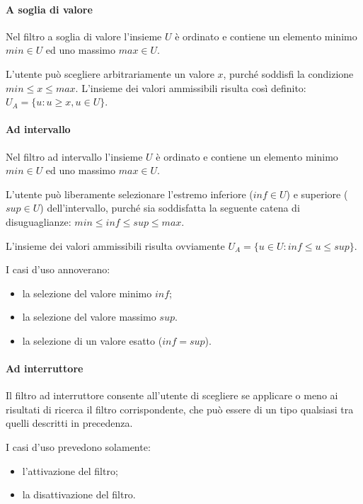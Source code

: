 \paragraph{A soglia di valore}
Nel filtro a soglia di valore l'insieme $U$ è ordinato e contiene un elemento minimo $min \in U$ ed uno massimo $max \in U$.

L'utente può scegliere arbitrariamente un valore $x$, purché soddisfi la condizione $min \leq x \leq max$. L'insieme dei valori ammissibili risulta così definito: $U_A = \lbrace u : u \geq x, u \in U\rbrace$.

\paragraph{Ad intervallo}
Nel filtro ad intervallo l'insieme $U$ è ordinato e contiene un elemento minimo $min \in U$ ed uno massimo $max \in U$.

L'utente può liberamente selezionare l'estremo inferiore ($inf \in U$) e superiore ($sup\in U$) dell'intervallo, purché sia soddisfatta la seguente catena di disuguaglianze: $min \leq inf \leq sup \leq max$.

L'insieme dei valori ammissibili risulta ovviamente $U_A = \lbrace u \in U : inf \leq u \leq sup \rbrace$.

I casi d'uso annoverano:
\begin{itemize}
	\item la selezione del valore minimo $inf$;
	\item la selezione del valore massimo $sup$.
	\item la selezione di un valore esatto ($inf = sup$).
\end{itemize}

\paragraph{Ad interruttore}
Il filtro ad interruttore consente all'utente di scegliere se applicare o meno ai risultati di ricerca il filtro corrispondente, che può essere di un tipo qualsiasi tra quelli descritti in precedenza.

I casi d'uso prevedono solamente:
\begin{itemize}
	\item l'attivazione del filtro;
	\item la disattivazione del filtro.
\end{itemize}

